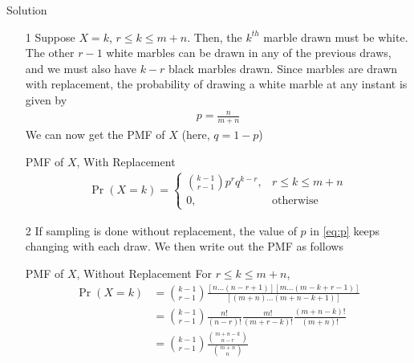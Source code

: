 \documentclass{beamer}
\providecommand{\pr}[1]{\ensuremath{\Pr\left(#1\right)}}
\begin{document}
\begin{frame}{Solution}
	\begin{enumerate}		
		\item[1] Suppose $X = k$, $r \leq k \leq m + n$. Then, the $k^{th}$ marble drawn must be white. The other $r - 1$ white marbles can be drawn in any of the previous draws, and we must also have $k - r$ black marbles drawn. Since marbles are drawn with replacement, the probability of drawing a white marble at any instant is given by
			\begin{align}
				p = \frac{n}{m + n}
				\label{eq:p}
			\end{align}
			We can now get the PMF of $X$ (here, $q = 1 - p$)
			\begin{alertblock}{PMF of $X$, With Replacement}
        		\begin{align}
					\pr{X = k} =
					\begin{cases}
						\binom{k - 1}{r - 1}p^rq^{k - r}, & r \leq k \leq m + n \\
						0, & \textrm{otherwise}
					\end{cases}
					\label{eq:pmf}
		        \end{align}
    		\end{alertblock}
	\end{enumerate}
\end{frame}

\begin{frame}
	\begin{enumerate}
		\item[2] If sampling is done without replacement, the value of $p$ in \eqref{eq:p} keeps changing with each draw. We then write out the PMF as follows
			\begin{alertblock}{PMF of $X$, Without Replacement}
        		For $r \leq k \leq m + n$,
				\begin{align}
					\pr{X = k} &= \binom{k - 1}{r - 1}\frac{[n\ldots(n - r + 1)][m\ldots(m - k + r - 1)]}{[(m + n)\ldots(m + n - k + 1)]} \label{eq:c}\\
					&= \binom{k - 1}{r - 1}\frac{n!}{(n - r)!}\frac{m!}{(m + r - k)!}\frac{(m + n - k)!}{(m + n)!} \\
					&= \binom{k - 1}{r - 1}\frac{\binom{m + n - k}{n - r}}{\binom{m + n}{n}} \\
					\label{eq:pmf_norep}
		        \end{align}
    		\end{alertblock}
	\end{enumerate}
\end{frame}
\end{document}
